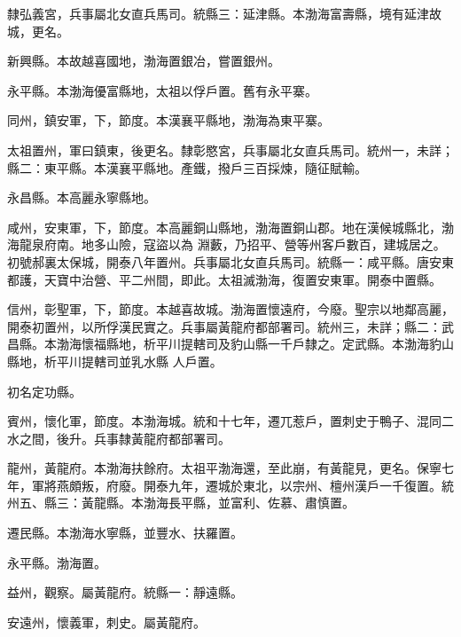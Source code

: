 \begin{pinyinscope}
 隸弘義宮，兵事屬北女直兵馬司。統縣三：延津縣。本渤海富壽縣，境有延津故城，更名。



 新興縣。本故越喜國地，渤海置銀冶，嘗置銀州。



 永平縣。本渤海優富縣地，太祖以俘戶置。舊有永平寨。



 同州，鎮安軍，下，節度。本漢襄平縣地，渤海為東平寨。



 太祖置州，軍曰鎮東，後更名。隸彰愍宮，兵事屬北女直兵馬司。統州一，未詳；縣二：東平縣。本漢襄平縣地。產鐵，撥戶三百採煉，隨征賦輸。



 永昌縣。本高麗永寧縣地。



 咸州，安東軍，下，節度。本高麗銅山縣地，渤海置銅山郡。地在漢候城縣北，渤海龍泉府南。地多山險，寇盜以為
 淵藪，乃招平、營等州客戶數百，建城居之。初號郝裏太保城，開泰八年置州。兵事屬北女直兵馬司。統縣一：咸平縣。唐安東都護，天寶中治營、平二州間，即此。太祖滅渤海，復置安東軍。開泰中置縣。



 信州，彰聖軍，下，節度。本越喜故城。渤海置懷遠府，今廢。聖宗以地鄰高麗，開泰初置州，以所俘漢民實之。兵事屬黃龍府都部署司。統州三，未詳；縣二：武昌縣。本渤海懷福縣地，析平川提轄司及豹山縣一千戶隸之。定武縣。本渤海豹山縣地，析平川提轄司並乳水縣
 人戶置。



 初名定功縣。



 賓州，懷化軍，節度。本渤海城。統和十七年，遷兀惹戶，置刺史于鴨子、混同二水之間，後升。兵事隸黃龍府都部署司。



 龍州，黃龍府。本渤海扶餘府。太祖平渤海還，至此崩，有黃龍見，更名。保寧七年，軍將燕頗叛，府廢。開泰九年，遷城於東北，以宗州、檀州漢戶一千復置。統州五、縣三：黃龍縣。本渤海長平縣，並富利、佐慕、肅慎置。



 遷民縣。本渤海水寧縣，並豐水、扶羅置。



 永平縣。渤海置。



 益州，觀察。屬黃龍府。統縣一：靜遠縣。



 安遠州，懷義軍，刺史。屬黃龍府。




\end{pinyinscope}
